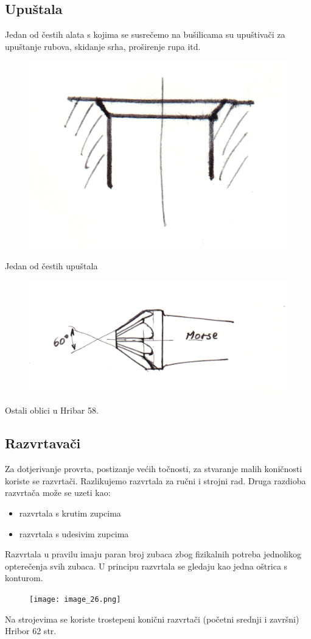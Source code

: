 \documentclass[a4paper,12pt]{article}
\numberwithin{figure}{section}
\begin{document}
\subsection{Upuštala}
Jedan od čestih alata s kojima se susrečemo na bušilicama su upuštivači za upuštanje rubova, skidanje srha, proširenje rupa itd.
\begin{figure}[!h]
\centering
\includegraphics[scale=0.13]{image_25-3.png}
\end{figure}
\FloatBarrier
Jedan od čestih upuštala
\begin{figure}[!h]
\centering
\includegraphics[scale=0.13]{image_25-4.png}
\end{figure}
\FloatBarrier
Ostali oblici u Hribar 58.
\subsection{Razvrtavači}
Za dotjerivanje provrta, postizanje većih točnosti, za stvaranje malih koničnosti koriste se razvrtači. Razlikujemo razvrtala za ručni i strojni rad. Druga razdioba razvrtača može se  uzeti kao:
\begin{itemize}
\item razvrtala s krutim zupcima
\item razvrtala s udesivim zupcima
\end{itemize}
Razvrtala u pravilu imaju paran broj zubaca zbog fizikalnih potreba jednolikog opterečenja svih zubaca. U principu razvrtala se gledaju kao jedna oštrica s konturom.
\begin{figure}[!h]
\centering
\texttt{[image: image\_26.png]}
\end{figure}
\FloatBarrier
\noindent Na strojevima se koriste trostepeni konični razvrtači (početni srednji i završni) Hribor 62 str.
\clearpage
\end{document}
